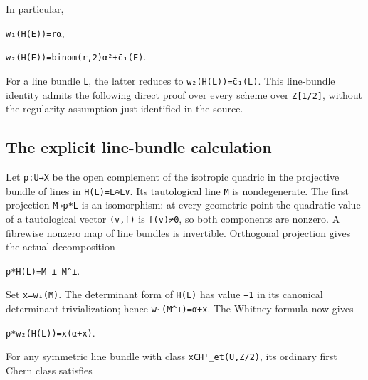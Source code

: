 \documentclass[
  10pt,
]{article}
\begin{document}
In particular,

\texttt{\small w₁(\allowbreak{}H(\allowbreak{}E)\allowbreak{})\allowbreak{}=\allowbreak{}rα},

\texttt{\small w₂(\allowbreak{}H(\allowbreak{}E)\allowbreak{})\allowbreak{}=\allowbreak{}binom(\allowbreak{}r,\allowbreak{}2)\allowbreak{}α²+\allowbreak{}c̄₁(\allowbreak{}E)\allowbreak{}}.

For a line bundle \texttt{\small L}, the latter reduces to
\texttt{\small w₂(\allowbreak{}H(\allowbreak{}L)\allowbreak{})\allowbreak{}=\allowbreak{}c̄₁(\allowbreak{}L)\allowbreak{}}.
This line-bundle identity admits the following direct proof over every
scheme over
\texttt{\small Z[\allowbreak{}1/\allowbreak{}2]\allowbreak{}}, without
the regularity assumption just identified in the source.

\subsection{The explicit line-bundle
calculation}\label{the-explicit-line-bundle-calculation}

Let \texttt{\small p:\allowbreak{}U→\allowbreak{}X} be the open
complement of the isotropic quadric in the projective bundle of lines in
\texttt{\small H(\allowbreak{}L)\allowbreak{}=\allowbreak{}L⊕\allowbreak{}L∨}.
Its tautological line \texttt{\small M} is nondegenerate. The first
projection \texttt{\small M→\allowbreak{}p*L} is an isomorphism: at
every geometric point the quadratic value of a tautological vector
\texttt{\small (\allowbreak{}v,\allowbreak{}f)\allowbreak{}} is
\texttt{\small f(\allowbreak{}v)\allowbreak{}≠0}, so both components are
nonzero. A fibrewise nonzero map of line bundles is invertible.
Orthogonal projection gives the actual decomposition

\texttt{\small p*H(\allowbreak{}L)\allowbreak{}=\allowbreak{}M ⊥ M\textasciicircum{}⊥}.

Set \texttt{\small x=\allowbreak{}w₁(\allowbreak{}M)\allowbreak{}}. The
determinant form of \texttt{\small H(\allowbreak{}L)\allowbreak{}} has
value \texttt{\small −1} in its canonical determinant trivialization;
hence
\texttt{\small w₁(\allowbreak{}M\textasciicircum{}⊥)\allowbreak{}=\allowbreak{}α+\allowbreak{}x}.
The Whitney formula now gives

\texttt{\small p*w₂(\allowbreak{}H(\allowbreak{}L)\allowbreak{})\allowbreak{}=\allowbreak{}x(\allowbreak{}α+\allowbreak{}x)\allowbreak{}}.

For any symmetric line bundle with class
\texttt{\small x∈H¹\_\allowbreak{}et(\allowbreak{}U,\allowbreak{}Z/\allowbreak{}2)\allowbreak{}},
its ordinary first Chern class satisfies
\end{document}
